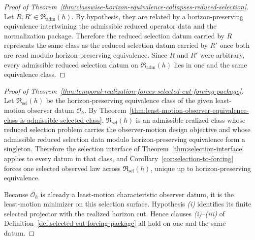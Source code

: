 \begin{proof}[Proof of Theorem~\ref{thm:classwise-horizon-equivalence-collapses-reduced-selection}]
\label{proof:thm:classwise-horizon-equivalence-collapses-reduced-selection}
Let \(R,R'\in\mathfrak R_{\mathrm{adm}}(h)\). By hypothesis, they are related
by a horizon-preserving equivalence intertwining the admissible reduced
operator data and the normalization package. Therefore the reduced selection
datum carried by \(R\) represents the same class as the reduced selection
datum carried by \(R'\) once both are read modulo horizon-preserving
equivalence. Since \(R\) and \(R'\) were arbitrary, every admissible reduced
selection datum on \(\mathfrak R_{\mathrm{adm}}(h)\) lies in one and the same
equivalence class.
\end{proof}

\begin{proof}[Proof of Theorem~\ref{thm:temporal-realization-forces-selected-cut-forcing-package}]
\label{proof:thm:temporal-realization-forces-selected-cut-forcing-package}
Let \(\mathfrak R_{\mathrm{sel}}(h)\) be the horizon-preserving equivalence
class of the given least-motion observer datum \(\mathcal O_h\). By
Theorem~\ref{thm:least-motion-observer-equivalence-class-is-admissible-selected-class},
\(\mathfrak R_{\mathrm{sel}}(h)\) is an admissible realized class whose
reduced selection problem carries the observer-motion design objective and
whose admissible reduced selection data modulo horizon-preserving equivalence
form a singleton. Therefore the selection interface of
Theorem~\ref{thm:selection-interface} applies to every datum in that class, and
Corollary~\ref{cor:selection-to-forcing} forces one selected observed law
across \(\mathfrak R_{\mathrm{sel}}(h)\), unique up to horizon-preserving
equivalence.

Because \(\mathcal O_h\) is already a least-motion characteristic observer
datum, it is the least-motion minimizer on this selection surface. Hypothesis
\emph{(i)} identifies its finite selected projector with the realized horizon
cut. Hence clauses \emph{(i)}--\emph{(iii)} of
Definition~\ref{def:selected-cut-forcing-package} all hold on one and the same
datum.
\end{proof}

